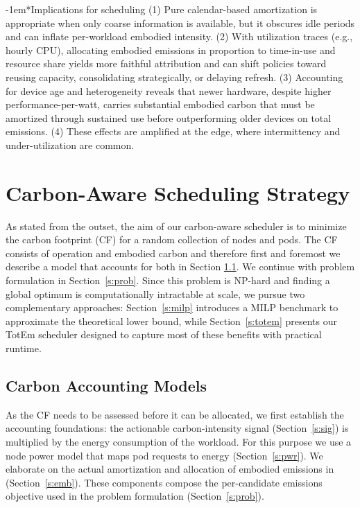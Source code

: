 \documentclass[10pt,journal,compsoc]{IEEEtran}
\makeatletter
\renewcommand{\paragraph}{\@startsection{paragraph}{4}{0pt}{1.5ex plus 1.5ex minus 0.5ex}%
{-1em}{\normalfont\normalsize\bfseries}}
\makeatother
\begin{document}
\paragraph*{Implications for scheduling} (1) Pure calendar-based amortization is appropriate when only coarse information is available, but it obscures idle periods and can inflate per-workload embodied intensity. (2) With utilization traces (e.g., hourly CPU), allocating embodied emissions in proportion to time-in-use and resource share yields more faithful attribution and can shift policies toward reusing capacity, consolidating strategically, or delaying refresh. (3) Accounting for device age and heterogeneity reveals that newer hardware, despite higher performance-per-watt, carries substantial embodied carbon that must be amortized through sustained use before outperforming older devices on total emissions. (4) These effects are amplified at the edge, where intermittency and under-utilization are common.

\section{Carbon-Aware Scheduling Strategy}\label{s:method}

As stated from the outset, the aim of our carbon-aware scheduler is to minimize the carbon footprint (CF) for a random collection of nodes and pods. The CF consists of operation and embodied carbon and therefore first and foremost we describe a model that accounts for both in Section \ref{s:acc}. We continue with problem formulation in Section~\ref{s:prob}. Since this problem is NP-hard and finding a global optimum is computationally intractable at scale, we pursue two complementary approaches: Section~\ref{s:milp} introduces a MILP benchmark to approximate the theoretical lower bound, while Section~\ref{s:totem} presents our TotEm scheduler designed to capture most of these benefits with practical runtime.

\subsection{Carbon Accounting Models}\label{s:acc}

As the CF needs to be assessed before it can be allocated, we first establish the accounting foundations: the actionable carbon-intensity signal (Section~\ref{s:sig}) is multiplied by the energy consumption of the workload. For this purpose we use a node power model that maps pod requests to energy (Section~\ref{s:pwr}). We elaborate on the actual amortization and allocation of embodied emissions in (Section~\ref{s:emb}). These components compose the per-candidate emissions objective used in the problem formulation (Section~\ref{s:prob}).
\end{document}
